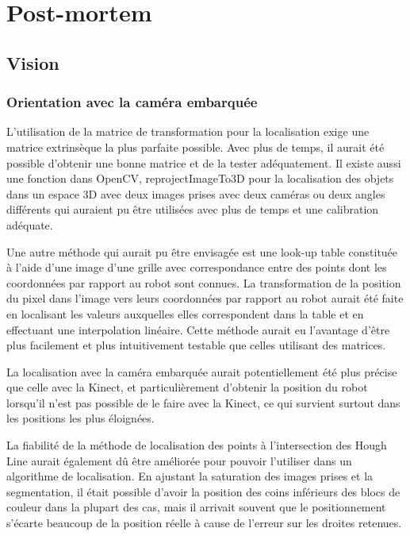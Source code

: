 

\chapter{Post-mortem}

\section{Vision}

\subsection{Orientation avec la caméra embarquée}

L'utilisation de la matrice de transformation pour la localisation exige une matrice extrinsèque la plus parfaite possible. Avec plus de temps, il aurait été possible d'obtenir une bonne matrice et de la tester adéquatement. Il existe aussi une fonction dans OpenCV, reprojectImageTo3D pour la localisation des objets dans un espace 3D avec deux images prises avec deux caméras ou deux angles différents qui auraient pu être utilisées avec plus de temps et une calibration adéquate. 

Une autre méthode qui aurait pu être envisagée est une look-up table constituée à l’aide d’une image d'une grille avec correspondance entre des points dont les coordonnées par rapport au robot sont connues. La transformation de la position du pixel dans l'image vers leurs coordonnées par rapport au robot aurait été faite en localisant les valeurs auxquelles elles correspondent dans la table et en effectuant une interpolation linéaire. Cette méthode aurait eu l'avantage d'être plus facilement et plus intuitivement testable que celles utilisant des matrices.

La localisation avec la caméra embarquée aurait potentiellement été plus précise que celle avec la Kinect, et particulièrement d'obtenir la position du robot lorsqu'il n'est pas possible de le faire avec la Kinect, ce qui survient surtout dans les positions les plus éloignées. 

La fiabilité de la méthode de localisation des points à l'intersection des Hough Line aurait également dû être améliorée pour pouvoir l'utiliser dans un algorithme de localisation. En ajustant la saturation des images prises et la segmentation, il était possible d'avoir la position des coins inférieurs des blocs de couleur dans la plupart des cas, mais il arrivait souvent que le positionnement s'écarte beaucoup de la position réelle à cause de l'erreur sur les droites retenues.


